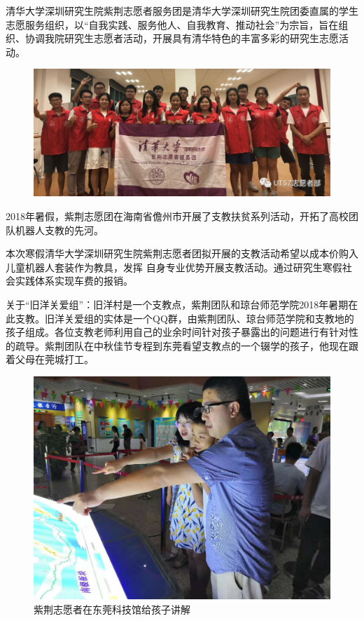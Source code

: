 清华大学深圳研究生院紫荆志愿者服务团是清华大学深圳研究生院团委直属的学生志愿服务组织，以“自我实践、服务他人、自我教育、推动社会”为宗旨，旨在组织、协调我院研究生志愿者活动，开展具有清华特色的丰富多彩的研究生志愿活动。
\begin{figure}[!ht]
\centering
\includegraphics[width=14cm]{pic/zijing.png}
\end{figure}
2018年暑假，紫荆志愿团在海南省儋州市开展了支教扶贫系列活动，开拓了高校团队机器人支教的先河。


本次寒假清华大学深圳研究生院紫荆志愿者团拟开展的支教活动希望以成本价购入儿童机器人套装作为教具，发挥
自身专业优势开展支教活动。通过研究生寒假社会实践体系实现车费的报销。

关于“旧洋关爱组”：旧洋村是一个支教点，紫荆团队和琼台师范学院2018年暑期在此支教。旧洋关爱组的实体是一个QQ群，由紫荆团队、琼台师范学院和支教地的孩子组成。各位支教老师利用自己的业余时间针对孩子暴露出的问题进行有针对性的疏导。紫荆团队在中秋佳节专程到东莞看望支教点的一个辍学的孩子，他现在跟着父母在莞城打工。
\begin{figure}[!ht]
\centering
\includegraphics[width=12cm]{pic/zijing_talk.jpeg}
\caption{紫荆志愿者在东莞科技馆给孩子讲解}
\end{figure}